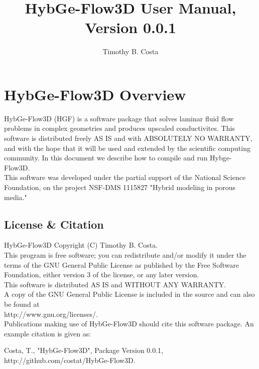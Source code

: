 \documentclass{report}
\title{HybGe-Flow3D User Manual, Version 0.0.1}
\author{Timothy B. Costa}
\begin{document}
\maketitle
\tableofcontents

\chapter{HybGe-Flow3D Overview}

HybGe-Flow3D (HGF) is a software package that solves laminar fluid flow problems
in complex geometries and produces upscaled conductivites. This software
is distributed freely AS IS and with ABSOLUTELY NO WARRANTY, and with
the hope that it will be used and extended by the scientific computing community.
In this document we describe how to compile and run Hybge-Flow3D.\\

This software was developed under the partial support of the National Science Foundation,
on the project NSF-DMS 1115827 "Hybrid modeling in porous media."

\section{License \& Citation}

HybGe-Flow3D Copyright (C) Timothy B. Costa.\\

\noindent This program is free software; you can redistribute and/or modify it under the terms
of the GNU General Public License as published by the Free Software Foundation, either
version 3 of the license, or any later version.\\

\noindent This software is distributed AS IS and WITHOUT ANY WARRANTY.\\

\noindent A copy of the GNU General Public License is included in the source and can also be found
at \\ http://www.gnu.org/licenses/.\\

\noindent Publications making use of HybGe-Flow3D should cite this software package. An example citation
is given as:

\begin{mdframed}[style=MyFrame]
  Costa, T., "HybGe-Flow3D", Package Version 0.0.1, http://github.com/costat/HybGe-Flow3D.
\end{mdframed}
\end{document}
